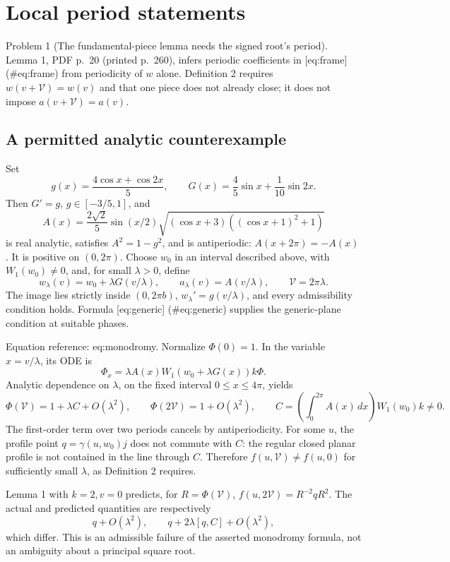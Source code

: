 \documentclass[10pt]{article}
\begin{document}
\section*{Local period statements}
Problem 1 (The fundamental-piece lemma needs the signed root’s period).  Lemma 1, PDF p. 20 (printed p. 260), infers periodic coefficients in [eq:frame] (\#eq:frame) from periodicity of \(w\) alone. Definition 2 requires \(w(v+\mathcal V)=w(v)\) and that one piece does not already close; it does not impose \(a(v+\mathcal V)=a(v)\).\par
\subsection*{A permitted analytic counterexample}
Set \[g(x)=\frac{4\cos x+\cos2x}{5},\qquad
 G(x)=\frac45\sin x+\frac1{10}\sin2x.\] Then \(G'=g\), \(g\in[-3/5,1]\), and \[A(x)=\frac{2\sqrt2}{5}\sin(x/2)
       \sqrt{(\cos x+3)((\cos x+1)^2+1)}\] is real analytic, satisfies \(A^2=1-g^2\), and is antiperiodic: \(A(x+2\pi)=-A(x)\). It is positive on \((0,2\pi)\). Choose \(w_0\) in an interval described above, with \(W_1(w_0)\ne0\), and, for small \(\lambda>0\), define \[w_\lambda(v)=w_0+\lambda G(v/\lambda),\qquad
 a_\lambda(v)=A(v/\lambda),\qquad \mathcal V=2\pi\lambda.\] The image lies strictly inside \((0,2\pi b)\), \(w_\lambda'=g(v/\lambda)\), and every admissibility condition holds. Formula [eq:generic] (\#eq:generic) supplies the generic-plane condition at suitable phases.\par
Equation reference: eq:monodromy. Normalize \(\Phi(0)=1\). In the variable \(x=v/\lambda\), its ODE is \[\Phi_x=\lambda A(x)W_1(w_0+\lambda G(x))k\Phi.\] Analytic dependence on \(\lambda\), on the fixed interval \(0\le x\le4\pi\), yields \[
 \Phi(\mathcal V)=1+\lambda C+O(\lambda^2),\qquad
 \Phi(2\mathcal V)=1+O(\lambda^2),\qquad
 C=\left(\int_0^{2\pi}A(x)\,dx\right)W_1(w_0)k\ne0.\] The first-order term over two periods cancels by antiperiodicity. For some \(u\), the profile point \(q=\gamma(u,w_0)j\) does not commute with \(C\): the regular closed planar profile is not contained in the line through \(C\). Therefore \(f(u,\mathcal V)\ne f(u,0)\) for sufficiently small \(\lambda\), as Definition 2 requires.\par
Lemma 1 with \(k=2,v=0\) predicts, for \(R=\Phi(\mathcal V)\), \(f(u,2\mathcal V)=R^{-2}qR^2\). The actual and predicted quantities are respectively \[q+O(\lambda^2),\qquad
 q+2\lambda[q,C]+O(\lambda^2),\] which differ. This is an admissible failure of the asserted monodromy formula, not an ambiguity about a principal square root.\par
\end{document}
